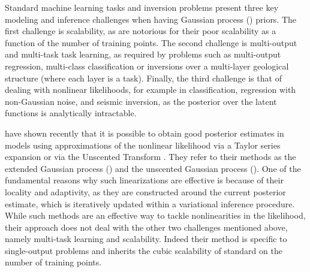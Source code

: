 %
Standard machine learning tasks and inversion problems present three key
modeling and inference challenges when having Gaussian process (\gp) priors.
The first challenge is scalability, as  are notorious for their poor
scalability as a function of the number of training points. The second
challenge is multi-output and multi-task task learning, as required by problems
such as multi-output regression, multi-class classification or inversions over a
multi-layer geological structure (where each layer is a task).  Finally, the
third challenge is that of dealing with nonlinear likelihoods, for example in
classification, regression with non-Gaussian noise, and seismic inversion, as
the posterior over the latent functions is analytically intractable.  

\citet{steinberg-bonilla-nips-2014} have shown recently that it is possible to obtain
good posterior estimates in  \gp models using  approximations of the 
nonlinear  likelihood  via a Taylor
series expansion or via the Unscented Transform \citep{Julier2004}.  They refer
to their methods as the extended Gaussian process (\egp)
and the unscented Gaussian process (\ugp).  One of the fundamental reasons why
such linearizations are effective is because of their locality and adaptivity,
as they are constructed around the current posterior estimate, which is
iteratively updated within a variational inference procedure.
% 
While such methods are an effective way to
tackle nonlinearities in the likelihood, their approach  does not deal with the
other two challenges mentioned above, namely multi-task learning and
scalability. Indeed their method is specific to single-output problems and
inherits the cubic scalability of standard  on the
number of training points. 

